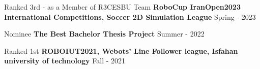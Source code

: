 \begin{cventries}

    \cventry
    {Ranked 3rd - as a Member of R3CESBU Team}
    {\textbf {RoboCup IranOpen2023 International Competitions, Soccer 2D Simulation League}}
    {}
    {Spring - 2023}
    {}
    \vspace{0.35 cm}

    \cventry
    {Nominee}
    {\textbf {The Best Bachelor Thesis Project}}
    {}
    {Summer - 2022}
    {}
    \vspace{0.35 cm}

    \cventry
    {Ranked 1st}
    {\textbf {ROBOIUT2021, Webots’ Line Follower league, Isfahan university of technology}}
    {}
    {Fall - 2021}
    {}
\end{cventries}
